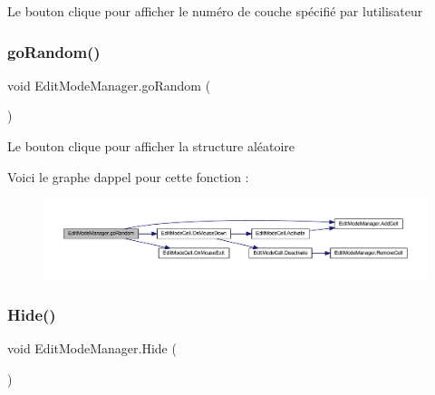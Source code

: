 Le bouton clique pour afficher le numéro de couche spécifié par l\textquotesingle{}utilisateur 

\mbox{\label{class_edit_mode_manager_a96ee789fb9bf31726bf942d334775a92}} 
\subsubsection{\texorpdfstring{go\+Random()}{goRandom()}}
{\footnotesize\ttfamily void Edit\+Mode\+Manager.\+go\+Random (\begin{DoxyParamCaption}{ }\end{DoxyParamCaption})\hspace{0.3cm}{\ttfamily [inline]}}



Le bouton clique pour afficher la structure aléatoire 

Voici le graphe d\textquotesingle{}appel pour cette fonction \+:
\nopagebreak
\begin{figure}[H]
\begin{center}
\leavevmode
\includegraphics[width=350pt]{class_edit_mode_manager_a96ee789fb9bf31726bf942d334775a92_cgraph}
\end{center}
\end{figure}
\mbox{\label{class_edit_mode_manager_aacc30d9cdb3d747fbad20130903ec24e}} 
\subsubsection{\texorpdfstring{Hide()}{Hide()}}
{\footnotesize\ttfamily void Edit\+Mode\+Manager.\+Hide (\begin{DoxyParamCaption}{ }\end{DoxyParamCaption})\hspace{0.3cm}{\ttfamily [inline]}}



